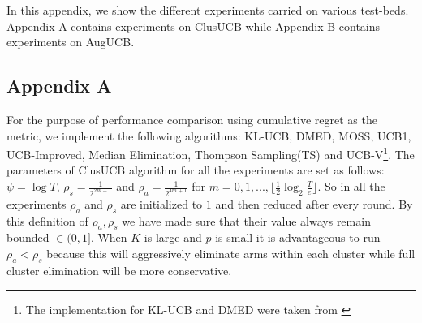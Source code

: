 In this appendix, we show the different experiments carried on various test-beds. Appendix A contains experiments on ClusUCB while Appendix B contains experiments on AugUCB.

\subsection*{Appendix A}
\label{AppendixA}
For the purpose of performance comparison using cumulative regret as the metric, we implement the following algorithms:  KL-UCB\cite{garivier2011kl}, DMED\cite{honda2010asymptotically}, MOSS\cite{audibert2009minimax}, UCB1\cite{auer2002finite}, UCB-Improved\cite{auer2010ucb}, Median Elimination\cite{even2006action}, Thompson Sampling(TS)\cite{agrawal2011analysis} and UCB-V\cite{audibert2009exploration}\footnote{The implementation for KL-UCB and DMED were taken from \cite{CapGarKau12}}. The parameters of ClusUCB algorithm for all the experiments are set as follows: $\psi=\log T$, $\rho_{s}=\frac{1}{2^{2m+1}}$ and $\rho_{a}=\frac{1}{2^{4m+1}}$ for $m=0,1,..., \lfloor \frac{1}{2}\log_{2} \frac{T}{e}\rfloor$. So in all the experiments $\rho_{a}$ and $\rho_{s}$ are initialized to $1$ and then reduced after every round. By this definition of $\rho_{a},\rho_{s}$ we have made sure that their value always remain bounded $\in(0,1]$. When $K$ is large and $p$ is small it is advantageous to run $\rho_{a} < \rho_{s}$ because this will aggressively eliminate arms within each cluster while full cluster elimination will be more conservative. 

